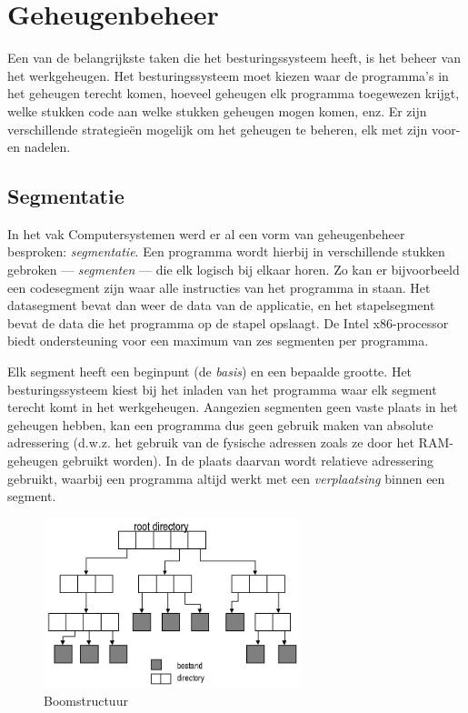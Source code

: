 \chapter{Geheugenbeheer}

Een van de belangrijkste taken die het besturingssysteem heeft, is het beheer
van het werkgeheugen. Het besturingssysteem moet kiezen waar de programma's in
het geheugen terecht komen, hoeveel geheugen elk programma toegewezen krijgt,
welke stukken code aan welke stukken geheugen mogen komen, enz. Er zijn
verschillende strategie\"en mogelijk om het geheugen te beheren, elk met zijn
voor- en nadelen.



\section{Segmentatie}

In het vak Computersystemen werd er al een vorm van geheugenbeheer besproken:
\emph{segmentatie}. Een programma wordt hierbij in verschillende stukken
gebroken --- \emph{segmenten} --- die elk logisch bij elkaar horen. Zo kan er bijvoorbeeld een
codesegment zijn waar alle instructies van het programma in staan. Het
datasegment bevat dan weer de data van de applicatie, en het stapelsegment bevat
de data die het programma op de stapel opslaagt. De Intel x86-processor biedt
ondersteuning voor een maximum van zes segmenten per programma.

Elk segment heeft een beginpunt (de \emph{basis}) en een bepaalde grootte. Het
besturingssysteem kiest bij het inladen van het programma waar elk segment
terecht komt in het werkgeheugen. Aangezien segmenten geen vaste plaats in het geheugen hebben, kan
een programma dus geen gebruik maken van absolute adressering (d.w.z. het
gebruik van de fysische adressen zoals ze door het RAM-geheugen gebruikt
worden). In de plaats daarvan wordt relatieve adressering gebruikt, waarbij een
programma altijd werkt met een \emph{verplaatsing} binnen een segment.

\begin{figure}
\begin{center}
\includegraphics[width=75mm]{images/fig0401.png}
\end{center}
\caption{Boomstructuur}
\label{boomstructuur}
\end{figure}

